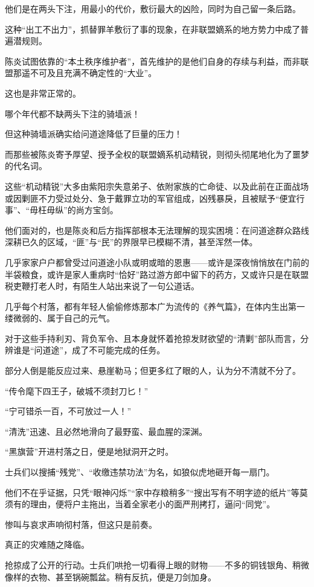 他们是在两头下注，用最小的代价，敷衍最大的凶险，同时为自己留一条后路。

这种“出工不出力”，抓替罪羊敷衍了事的现象，在非联盟嫡系的地方势力中成了普遍潜规则。

陈炎试图依靠的“本土秩序维护者”，首先维护的是他们自身的存续与利益，而非联盟那遥不可及且充满不确定性的“大业”。

这也是非常正常的。

哪个年代都不缺两头下注的骑墙派！

但这种骑墙派确实给问道途降低了巨量的压力！

\vspace{2em}

而那些被陈炎寄予厚望、授予全权的联盟嫡系机动精锐，则彻头彻尾地化为了噩梦的代名词。

这些“机动精锐”大多由紫阳宗失意弟子、依附家族的亡命徒、以及此前在正面战场或因剿匪不力受过处分、急于戴罪立功的军官组成，凶残暴戾，且被赋予“便宜行事”、“毋枉毋纵”的尚方宝剑。

他们面对的，也是陈炎和后方指挥部根本无法理解的现实困境：在问道途群众路线深耕已久的区域，“匪”与“民”的界限早已模糊不清，甚至浑然一体。

几乎家家户户都曾受过问道途小队或明或暗的恩惠——或许是深夜悄悄放在门前的半袋粮食，或许是家人重病时“恰好”路过游方郎中留下的药方，又或许只是在联盟税吏鞭打老人时，有陌生人站出来说了一句公道话。

几乎每个村落，都有年轻人偷偷修炼那本广为流传的《养气篇》，在体内生出第一缕微弱的、属于自己的元气。

对于这些手持利刃、背负军令、且本身就怀着抢掠发财欲望的“清剿”部队而言，分辨谁是“问道途”，成了不可能完成的任务。

部分人倒是能反应过来、悬崖勒马；但更多红了眼的人，认为分不清就不分了。

“传令麾下四王子，破城不须封刀匕！”

“宁可错杀一百，不可放过一人！”

“清洗”迅速、且必然地滑向了最野蛮、最血腥的深渊。

“黑旗营”开进村落之日，便是地狱洞开之时。

士兵们以搜捕“残党”、“收缴违禁功法”为名，如狼似虎地砸开每一扇门。

他们不在乎证据，只凭“眼神闪烁”“家中存粮稍多”“搜出写有不明字迹的纸片”等莫须有的理由，便将户主拖出，当着全家老小的面严刑拷打，逼问“同党”。

惨叫与哀求声响彻村落，但这只是前奏。

真正的灾难随之降临。

抢掠成了公开的行动。士兵们哄抢一切看得上眼的财物——不多的铜钱银角、稍微像样的衣物、甚至锅碗瓢盆。稍有反抗，便是刀剑加身。

